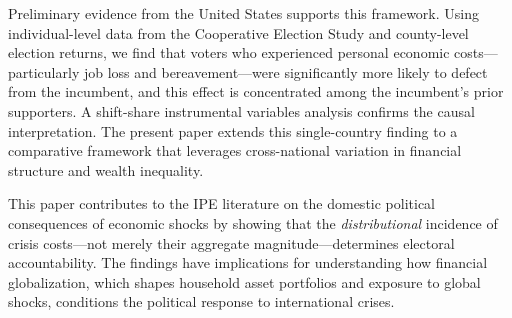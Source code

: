 Preliminary evidence from the United States supports this framework. Using individual-level data from the Cooperative Election Study and county-level election returns, we find that voters who experienced personal economic costs---particularly job loss and bereavement---were significantly more likely to defect from the incumbent, and this effect is concentrated among the incumbent's prior supporters. A shift-share instrumental variables analysis confirms the causal interpretation. The present paper extends this single-country finding to a comparative framework that leverages cross-national variation in financial structure and wealth inequality.

This paper contributes to the IPE literature on the domestic political consequences of economic shocks by showing that the \textit{distributional} incidence of crisis costs---not merely their aggregate magnitude---determines electoral accountability. The findings have implications for understanding how financial globalization, which shapes household asset portfolios and exposure to global shocks, conditions the political response to international crises.
